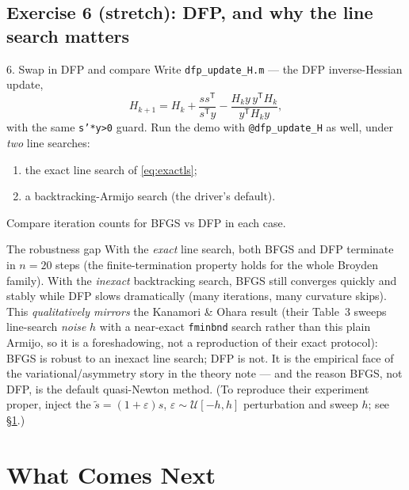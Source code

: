 \documentclass[11pt,letterpaper]{article}
\newcommand{\T}{^{\mathsf{T}}}
\begin{document}
\subsection{Exercise 6 (stretch): DFP, and why the line search matters}

\begin{exercise}{6. Swap in DFP and compare}
Write \texttt{dfp\_update\_H.m} --- the DFP inverse-Hessian update,
\[
  H_{k+1}=H_k+\frac{s s\T}{s\T y}-\frac{H_k y\,y\T H_k}{y\T H_k y},
\]
with the same \texttt{s'*y>0} guard. Run the demo with \texttt{@dfp\_update\_H} as
well, under \emph{two} line searches:
\begin{enumerate}[nosep]
  \item the exact line search of \eqref{eq:exactls};
  \item a backtracking-Armijo search (the driver's default).
\end{enumerate}
Compare iteration counts for BFGS vs DFP in each case.
\end{exercise}

\begin{checkpoint}{The robustness gap}
With the \emph{exact} line search, both BFGS and DFP terminate in $n=20$ steps (the
finite-termination property holds for the whole Broyden family). With the
\emph{inexact} backtracking search, BFGS still converges quickly and stably while DFP
slows dramatically (many iterations, many curvature skips). This \emph{qualitatively
mirrors} the Kanamori \& Ohara result (their Table~3 sweeps line-search \emph{noise}
$h$ with a near-exact \texttt{fminbnd} search rather than this plain Armijo, so it is
a foreshadowing, not a reproduction of their exact protocol): BFGS is robust to an
inexact line search; DFP is not. It is the empirical face of the variational/asymmetry
story in the theory note --- and the reason BFGS, not DFP, is the default quasi-Newton
method. (To reproduce their experiment proper, inject the $\tilde s=(1+\varepsilon)s$,
$\varepsilon\sim\mathcal U[-h,h]$ perturbation and sweep $h$; see
\S\ref{sec:next}.)
\end{checkpoint}

\section{What Comes Next}\label{sec:next}
\end{document}
